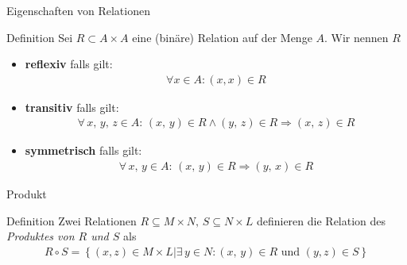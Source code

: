 \begin{frame}{Eigenschaften von Relationen}
    \begin{block}{Definition}
        Sei $R \subset A \times A$ eine (binäre) Relation auf der Menge $A$. Wir nennen $R$
        \begin{itemize}
            \item \textbf{reflexiv} falls gilt:
                \begin{align*}
                    \forall x \in A: \left( x,x\right) \in R
                \end{align*}
            \item\textbf{transitiv} falls gilt:
                \begin{align*}
                    \forall\, x,\, y,\, z \in A:\,\left( x,\, y\right) \in R \wedge \left(y,\, z\right) \in R \Rightarrow \left( x,\, z\right) \in R
                \end{align*}
            \item \textbf{symmetrisch} falls gilt:
                \begin{align*}
                    \forall\, x,\, y \in A:\,\left( x,\, y\right) \in R \Rightarrow \left( y,\, x\right) \in R
                \end{align*}
        \end{itemize}
    \end{block}
\end{frame}

\begin{frame}{Produkt}
    \begin{block}{Definition}
        Zwei Relationen $R\subseteq M \times N ,\, S\subseteq N\times L$ definieren die Relation des \emph{Produktes von $R$ und $S$} als
        \begin{align*}
            R \circ S = \left\{\left( x,z\right)\in M\times L | \exists\, y \in N :\left( x,\, y\right) \in R \text{ und } \left( y, z\right) \in S\right\}
        \end{align*}
    \end{block}
    \pause
\end{frame}

